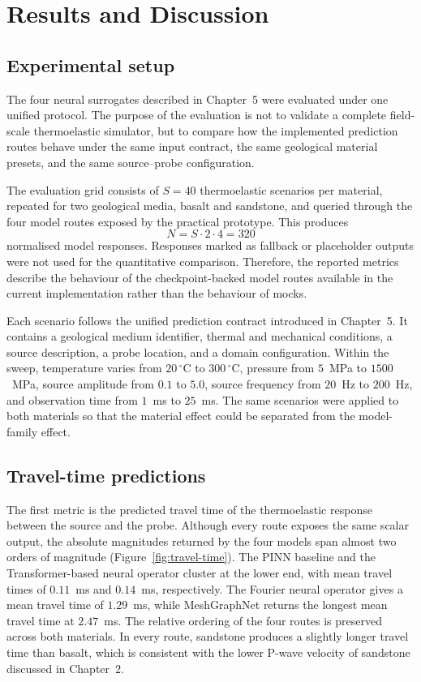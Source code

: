 \section{Results and Discussion}

\subsection{Experimental setup}

The four neural surrogates described in Chapter~5 were evaluated under
one unified protocol. The purpose of the evaluation is not to validate
a complete field-scale thermoelastic simulator, but to compare how the
implemented prediction routes behave under the same input contract,
the same geological material presets, and the same source--probe
configuration.

The evaluation grid consists of $S = 40$ thermoelastic scenarios per
material, repeated for two geological media, basalt and sandstone, and
queried through the four model routes exposed by the practical
prototype. This produces
\begin{equation}
N = S \cdot 2 \cdot 4 = 320
\end{equation}
normalised model responses. Responses marked as fallback or placeholder
outputs were not used for the quantitative comparison. Therefore, the
reported metrics describe the behaviour of the checkpoint-backed model
routes available in the current implementation rather than the behaviour
of mocks.

Each scenario follows the unified prediction contract introduced in
Chapter~5. It contains a geological medium identifier, thermal and
mechanical conditions, a source description, a probe location, and a
domain configuration. Within the sweep, temperature varies from
$20\,^{\circ}$C to $300\,^{\circ}$C, pressure from $5$~MPa to
$1500$~MPa, source amplitude from $0.1$ to $5.0$, source frequency
from $20$~Hz to $200$~Hz, and observation time from $1$~ms to
$25$~ms. The same scenarios were applied to both materials so that
the material effect could be separated from the model-family effect.

\subsection{Travel-time predictions}

The first metric is the predicted travel time of the thermoelastic
response between the source and the probe. Although every route exposes
the same scalar output, the absolute magnitudes returned by the four
models span almost two orders of magnitude (Figure~\ref{fig:travel-time}).
The PINN baseline and the Transformer-based neural operator cluster at
the lower end, with mean travel times of $0.11$~ms and $0.14$~ms,
respectively. The Fourier neural operator gives a mean travel time of
$1.29$~ms, while MeshGraphNet returns the longest mean travel time at
$2.47$~ms. The relative ordering of the four routes is preserved across
both materials. In every route, sandstone produces a slightly longer
travel time than basalt, which is consistent with the lower P-wave
velocity of sandstone discussed in Chapter~2.

